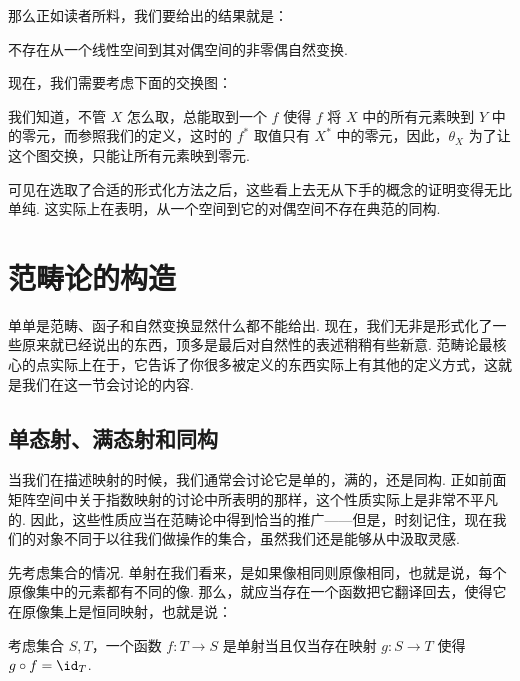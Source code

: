 那么正如读者所料，我们要给出的结果就是：

\begin{example}{}{}
    不存在从一个线性空间到其对偶空间的非零偶自然变换.

    现在，我们需要考虑下面的交换图：

    \begin{center}
    \end{center}

    我们知道，不管 $X$ 怎么取，总能取到一个 $f$ 使得 $f$ 将 $X$ 中的所有元素映到 $Y$ 中的零元，而参照我们的定义，这时的 $f^*$ 取值只有 $X^*$ 中的零元，因此，$\theta_X$ 为了让这个图交换，只能让所有元素映到零元.
\end{example}

可见在选取了合适的形式化方法之后，这些看上去无从下手的概念的证明变得无比单纯. 这实际上在表明，从一个空间到它的对偶空间不存在典范的同构.

\section{范畴论的构造}

单单是范畴、函子和自然变换显然什么都不能给出. 现在，我们无非是形式化了一些原来就已经说出的东西，顶多是最后对自然性的表述稍稍有些新意. 范畴论最核心的点实际上在于，它告诉了你很多被定义的东西实际上有其他的定义方式，这就是我们在这一节会讨论的内容.

\subsection{单态射、满态射和同构}

当我们在描述映射的时候，我们通常会讨论它是单的，满的，还是同构. 正如前面矩阵空间中关于指数映射的讨论中所表明的那样，这个性质实际上是非常不平凡的. 因此，这些性质应当在范畴论中得到恰当的推广——但是，时刻记住，现在我们的对象不同于以往我们做操作的集合，虽然我们还是能够从中汲取灵感.

先考虑集合的情况. 单射在我们看来，是如果像相同则原像相同，也就是说，每个原像集中的元素都有不同的像. 那么，就应当存在一个函数把它翻译回去，使得它在原像集上是恒同映射，也就是说：

\begin{lemma}{}{}
    考虑集合 $S, T$，一个函数 $f: T \to S$ 是单射当且仅当存在映射 $g: S \to T$ 使得 $g \circ f = \id_T$.
\end{lemma}

